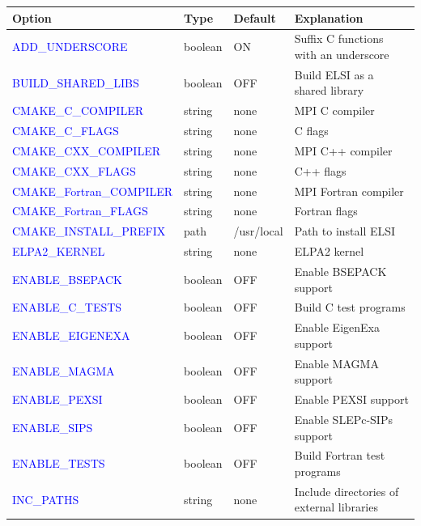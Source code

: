 \documentclass{report}
\newcommand{\tcb}[1]{\textcolor{blue}{#1}}
\begin{document}
\begin{longtable}[]{|p{50mm}|p{15mm}|p{20mm}|p{80mm}|}
\hline
\multicolumn{1}{|l|}{\textbf{Option}} & \multicolumn{1}{l|}{\textbf{Type}} & \multicolumn{1}{l|}{\textbf{Default}} & \multicolumn{1}{l|}{\textbf{Explanation}}\\
\hline
\tcb{ADD\_UNDERSCORE}          & boolean & ON          & Suffix C functions with an underscore\\
\hline
\tcb{BUILD\_SHARED\_LIBS}      & boolean & OFF         & Build ELSI as a shared library\\
\hline
\tcb{CMAKE\_C\_COMPILER}       & string  & none        & MPI C compiler\\
\hline
\tcb{CMAKE\_C\_FLAGS}          & string  & none        & C flags\\
\hline
\tcb{CMAKE\_CXX\_COMPILER}     & string  & none        & MPI C++ compiler\\
\hline
\tcb{CMAKE\_CXX\_FLAGS}        & string  & none        & C++ flags\\
\hline
\tcb{CMAKE\_Fortran\_COMPILER} & string  & none        & MPI Fortran compiler\\
\hline
\tcb{CMAKE\_Fortran\_FLAGS}    & string  & none        & Fortran flags\\
\hline
\tcb{CMAKE\_INSTALL\_PREFIX}   & path    & /usr/local  & Path to install ELSI\\
\hline
\tcb{ELPA2\_KERNEL}            & string  & none        & ELPA2 kernel\\
\hline
\tcb{ENABLE\_BSEPACK}          & boolean & OFF         & Enable BSEPACK support\\
\hline
\tcb{ENABLE\_C\_TESTS}         & boolean & OFF         & Build C test programs\\
\hline
\tcb{ENABLE\_EIGENEXA}         & boolean & OFF         & Enable EigenExa support\\
\hline
\tcb{ENABLE\_MAGMA}            & boolean & OFF         & Enable MAGMA support\\
\hline
\tcb{ENABLE\_PEXSI}            & boolean & OFF         & Enable PEXSI support\\
\hline
\tcb{ENABLE\_SIPS}             & boolean & OFF         & Enable SLEPc-SIPs support\\
\hline
\tcb{ENABLE\_TESTS}            & boolean & OFF         & Build Fortran test programs\\
\hline
\tcb{INC\_PATHS}               & string  & none        & Include directories of external libraries\\

\end{longtable}
\end{document}
